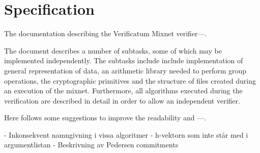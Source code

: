 \section{Specification}

The documentation describing the Verificatum Mixnet verifier---.

The document describes a number of subtasks, some of which may be
implemented independently. The subtasks include include implementation
of general representation of data, an arithmetic library needed to
perform group operations, the cryptographic primitives and the
structure of files created during an execution of the
mixnet. Furthermore, all algorithms executed during the verification
are described in detail in order to allow an independent verifier.

Here follows some suggestions to improve the readability and ---.

- Inkonsekvent namngivning i vissa algoritmer
- h-vektorn som inte står med i argumentlistan
- Beskrivning av Pedersen commitments


